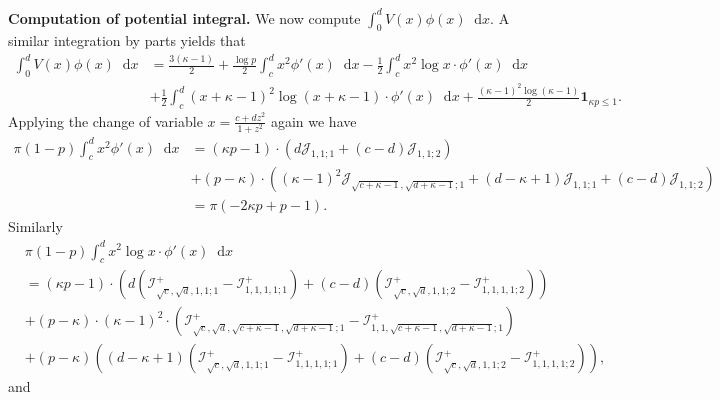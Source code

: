 \documentclass[reqno,11pt]{amsart}
\numberwithin{equation}{section}
\theoremstyle{definition}
\newcommand*\diff{\mathop{}\!\mathrm{d}}
\begin{document}
\noindent\textbf{Computation of potential integral.} We now compute $\displaystyle \int_0^d V(x)\phi(x)\diff x$. A similar integration by parts yields that 
\begin{equation*}
    \begin{aligned}
        \int_0^d V(x)\phi(x)\diff x &= \frac{3(\kappa-1)}{2}+\frac{\log p}{2}\int_{c}^{d} x^2 \phi'(x)\diff x -\frac{1}{2}\int_c^d x^2 \log x\cdot\phi'(x)\diff x\\
        &+ \frac{1}{2}\int_c^d (x+\kappa-1)^2\log (x+\kappa-1)\cdot \phi'(x)\diff x +\frac{(\kappa-1)^2\log(\kappa-1)}{2}\mathbf{1}_{\kappa p\leq 1}.
    \end{aligned}
\end{equation*}
Applying the change of variable $\displaystyle x=\frac{c+dz^2}{1+z^2}$ again we have 
\begin{equation*}
\begin{aligned}
    \pi(1-p)\int_{c}^d x^2\phi'(x)\diff x 
    &= (\kappa p-1)\cdot \left(d\mathcal{J}_{1,1;1}+(c-d)\mathcal{J}_{1,1;2}\right)\\
    &+(p-\kappa)\cdot \left((\kappa-1)^2 \mathcal{J}_{\sqrt{c+\kappa-1},\sqrt{d+\kappa-1};1}+(d-\kappa+1)\mathcal{J}_{1,1;1}+(c-d)\mathcal{J}_{1,1;2}\right)\\ &= \pi(-2\kappa p+p-1).
\end{aligned}
\end{equation*}
Similarly
\begin{equation*}
\begin{aligned}
    &\pi(1-p)\int_{c}^d x^2\log x\cdot \phi'(x)\diff x \\
    &= (\kappa p-1)\cdot \left(d(\mathcal{I}^+_{\sqrt{c},\sqrt{d},1,1;1}-\mathcal{I}^+_{1,1,1,1;1})+(c-d)(\mathcal{I}^+_{\sqrt{c},\sqrt{d},1,1;2}-\mathcal{I}^+_{1,1,1,1;2})\right)\\
    &+(p-\kappa)\cdot (\kappa-1)^2 \cdot (\mathcal{I}^+_{\sqrt{c},\sqrt{d},\sqrt{c+\kappa-1},\sqrt{d+\kappa-1};1}-\mathcal{I}^+_{1,1,\sqrt{c+\kappa-1},\sqrt{d+\kappa-1};1})\\
    &+(p-\kappa)\left((d-\kappa+1)(\mathcal{I}^+_{\sqrt{c},\sqrt{d},1,1;1}-\mathcal{I}^+_{1,1,1,1;1})+(c-d)(\mathcal{I}^{+}_{\sqrt{c},\sqrt{d},1,1;2}-\mathcal{I}^{+}_{1,1,1,1;2})\right),
\end{aligned}
\end{equation*}
and 
\end{document}
